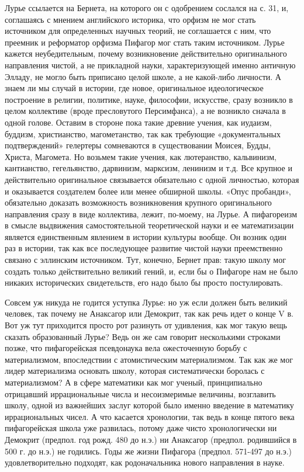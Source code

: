 Лурье ссылается на Бернета, на которого он с одобрением сослался
на с. 31, и, соглашаясь с мнением английского историка, что орфизм не
мог стать источником для определенных научных теорий, не соглашается с
ним, что преемник и реформатор орфизма Пифагор мог стать таким
источником. Лурье кажется неубедительным, почему возникновение
действительно оригинального направления чистой, а не прикладной науки,
характеризующей именно античную Элладу, не могло быть приписано целой
школе, а не какой-либо личности. А знаем ли мы случай в истории, где
новое, оригинальное идеологическое построение в религии, политике,
науке, философии, искусстве, сразу возникло в целом коллективе (вроде
пресловутого Персимфанса), а не возникло сначала в одной голове.
Оставим в стороне пока такие древние учения, как иудаизм, буддизм,
христианство, магометанство, так как требующие «документальных
подтверждений» гелертеры сомневаются в существовании Моисея, Будды,
Христа, Магомета. Но возьмем такие учения, как лютеранство,
кальвинизм, кантианство, гегельянство, дарвинизм, марксизм, ленинизм и
т.д. Все крупное и действительно оригинальное связывается обязательно
с одной личностью, которая и оказывается создателем более или менее
обширной школы. «Опус пробанди», обязательно доказать возможность
возникновения крупного оригинального направления сразу в виде
коллектива, лежит, по-моему, на Лурье. А пифагореизм в смысле
выдвижения самостоятельной теоретической науки и ее математизации
является единственным явлением в истории культуры вообще. Он возник
один раз в истории, так как все последующее развитие чистой науки
преемственно связано с эллинским источником. Тут, конечно, Бернет
прав: такую школу мог создать только действительно великий гений, и,
если бы о Пифагоре нам не было никаких исторических свидетельств, его
надо было бы просто постулировать.

Совсем уж никуда не годится уступка Лурье: но уж если должен быть
великий человек, так почему не Анаксагор или Демокрит, так как речь
идет о конце V в. Вот уж тут приходится просто рот разинуть от
удивления, как мог такую вещь сказать образованный Лурье? Ведь он же
сам говорит несколькими строками позже, что пифагорейская псевдонаука
вела ожесточенную борьбу с материализмом, впоследствии с
атомистическим материализмом. Так как же мог лидер материализма
основать школу, которая систематически боролась с материализмом? А в
сфере математики как мог ученый, принципиально отрицавший
иррациональные числа и несоизмеримые величины, возглавить школу, одной
из важнейших заслуг которой было именно введение в математику
иррациональных чисел. А что касается хронологии, так ведь в конце
пятого века пифагорейская школа уже развилась, потому даже чисто
хронологически ни Демокрит (предпол. год рожд. 480 до н.э.) ни
Анаксагор (предпол. родившийся в 500 г. до н.э.) не годились. Годы же
жизни Пифагора (предпол. 571-497 до н.э.) удовлетворительно подходят,
как родоначальника нового направления в науке.

